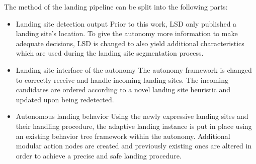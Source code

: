 The method of the landing pipeline can be split into the following parts:

\begin{itemize}
    \item Landing site detection output
    Prior to this work, LSD only published a landing site's location. To give the autonomy more information to make adequate decisions, LSD is changed to also yield additional characteristics which are used during the landing site segmentation process.
    \item Landing site interface of the autonomy
    The autonomy framework is changed to correctly receive and handle incoming landing sites. The incoming candidates are ordered according to a novel landing site heuristic and updated upon being redetected.
    \item Autonomous landing behavior
    Using the newly expressive landing sites and their handling procedure, the adaptive landing instance is put in place using an existing behavior tree framework within the autonomy. Additional modular action nodes are created and previously existing ones are altered in order to achieve a precise and safe landing procedure.
\end{itemize}